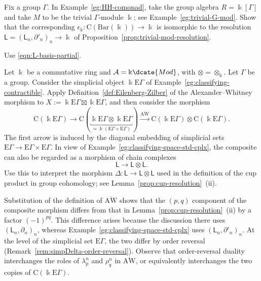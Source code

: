 	\item Fix a group $\Gamma$. In Example~\ref{eg:HH-comonad}, take the group
	algebra $R=\Bbbk[\Gamma]$ and take $M$ to be the trivial $\Gamma$-module
	$\Bbbk$; see Example~\ref{eg:trivial-G-mod}. Show that the corresponding
	$\epsilon_{\Bbbk}:\mathrm{C}(\mathrm{Bar}(\Bbbk))\to\Bbbk$ is isomorphic
	to the resolution $\mathsf{L}=(\mathsf{L}_n,\partial'_n)_n\to\Bbbk$ of
	Proposition~\ref{prop:trivial-mod-resolution}.
	\begin{hint}
		Use \eqref{eqn:L-basis-partial}.
	\end{hint}

	\item Let $\Bbbk$ be a commutative ring and
	$\mathcal{A}=\Bbbk\dcate{Mod}$, with $\otimes=\otimes_{\Bbbk}$. Let
	$\Gamma$ be a group. Consider the simplicial object
	$\Bbbk\mathrm{E}\Gamma$ of
	Example~\ref{eg:classifying-contractible}. Apply
	Definition~\ref{def:Eilenberg-Zilber} of the Alexander--Whitney morphism
	to $X:=\Bbbk\mathrm{E}\Gamma\boxtimes\Bbbk\mathrm{E}\Gamma$, and then
	consider the morphism
	\[ \mathrm{C}(\Bbbk\mathrm{E}\Gamma) \to \mathrm{C}(\underbracket{\Bbbk\mathrm{E}\Gamma \otimes \Bbbk\mathrm{E}\Gamma}_{\simeq \Bbbk(\mathrm{E}\Gamma \times \mathrm{E}\Gamma)}) \xrightarrow{\overline{\mathrm{AW}}} \mathrm{C}(\Bbbk\mathrm{E}\Gamma) \otimes \mathrm{C}(\Bbbk\mathrm{E}\Gamma). \]
	The first arrow is induced by the diagonal embedding of simplicial sets
	$\mathrm{E}\Gamma\to\mathrm{E}\Gamma\times\mathrm{E}\Gamma$. In view
	of Example~\ref{eg:classifying-space-std-cplx}, the composite can also be
	regarded as a morphism of chain complexes
	\[ \mathsf{L} \to \mathsf{L} \otimes \mathsf{L}. \]
	Use this to interpret the morphism
	$\Delta:\mathsf{L}\to\mathsf{L}\otimes\mathsf{L}$ used in the
	definition of the cup product in group cohomology; see
	Lemma~\ref{prop:cup-resolution}~(ii).

	\begin{hint}
		Substitution of the definition of $\overline{\mathrm{AW}}$ shows that
		the $(p,q)$ component of the composite morphism differs from that in
		Lemma~\ref{prop:cup-resolution}~(ii) by a factor $(-1)^{pq}$. This
		difference arises because the discussion there uses
		$(\mathsf{L}_n,\partial_n)_n$, whereas
		Example~\ref{eg:classifying-space-std-cplx} uses
		$(\mathsf{L}_n,\partial'_n)_n$. At the level of the simplicial set
		$\mathrm{E}\Gamma$, the two differ by order reversal
		(Remark~\ref{rem:simpDelta-order-reversal}). Observe that order-reversal
		duality interchanges the roles of $\lambda^n_p$ and $\rho^n_q$ in
		$\overline{\mathrm{AW}}$, or equivalently interchanges the two copies
		of $\mathrm{C}(\Bbbk\mathrm{E}\Gamma)$.
	\end{hint}


